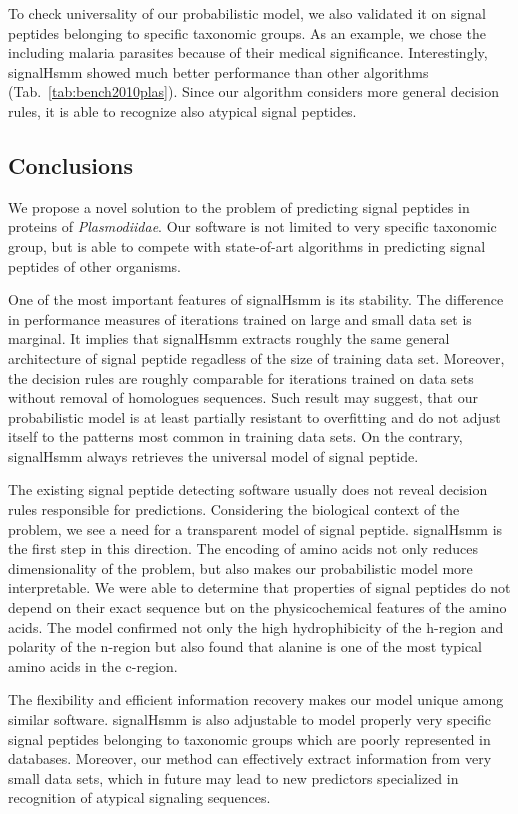 \documentclass[10pt,letterpaper]{article}
\begin{document}
To check universality of our probabilistic model, we also validated it on signal peptides belonging to specific taxonomic groups. As an example, we chose the  including malaria parasites because of their medical significance.  Interestingly, signalHsmm showed much better performance than other algorithms (Tab.~\ref{tab:bench2010plas}). Since our algorithm considers more general decision rules, it is able to recognize also atypical signal peptides.


\subsection*{Conclusions}

We propose a novel solution to the problem of predicting signal peptides in proteins of \textit{Plasmodiidae}. Our software is not limited to very specific taxonomic group, but is able to compete with state-of-art algorithms in predicting signal peptides of other organisms.

One of the most important features of signalHsmm is its stability. The difference in performance measures of iterations trained on large and small data set is marginal. It implies that signalHsmm extracts roughly the same general architecture of signal peptide regadless of the size of training data set. Moreover, the decision rules are roughly comparable for iterations trained on data sets without removal of homologues sequences.  Such result may suggest, that our probabilistic model is at least partially resistant to overfitting and do not adjust itself to the patterns most common in training data sets. On the contrary, signalHsmm always retrieves the universal model of signal peptide.

The existing signal peptide detecting software usually does not reveal decision rules responsible for predictions. Considering the biological context of the problem, we see a need for a transparent model of signal peptide. signalHsmm is the first step in this direction. The encoding of amino acids not only reduces dimensionality of the problem, but also makes our probabilistic model more interpretable. We were able to determine that properties of signal peptides do not depend on their exact sequence but on the physicochemical features of the amino acids. The model confirmed not only the high hydrophibicity of the h-region and polarity of the n-region but also found that alanine is one of the most typical amino acids in the c-region.

The flexibility and efficient information recovery makes our model unique among similar software. signalHsmm is also adjustable to model properly very specific signal peptides belonging to taxonomic groups which are poorly represented in databases. Moreover, our method can effectively extract information from very small data sets, which in future may lead to new predictors specialized in recognition of atypical signaling sequences.
\end{document}
